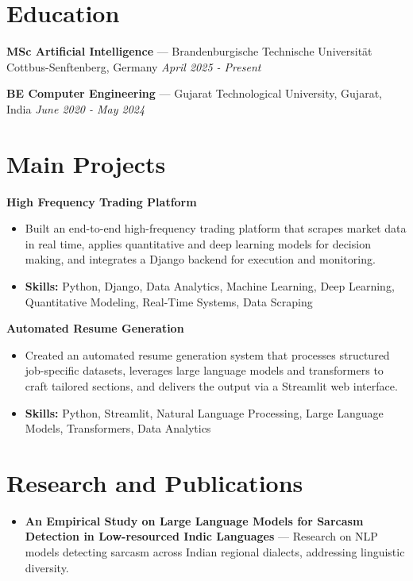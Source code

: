 \documentclass[a4paper,10pt]{article}
\begin{document}
\section*{Education}
\textbf{MSc Artificial Intelligence} — Brandenburgische Technische Universität Cottbus-Senftenberg, Germany \hfill \textit{April 2025 - Present}\par
\vspace{1.5pt}
\textbf{BE Computer Engineering} — Gujarat Technological University, Gujarat, India \hfill \textit{June 2020 - May 2024}\par

\section*{Main Projects}
\textbf{High Frequency Trading Platform}\par
\vspace{1pt}
\begin{itemize}
  \item Built an end-to-end high-frequency trading platform that scrapes market data in real time, applies quantitative and deep learning models for decision making, and integrates a Django backend for execution and monitoring.
  \item \textbf{Skills:} Python, Django, Data Analytics, Machine Learning, Deep Learning, Quantitative Modeling, Real-Time Systems, Data Scraping
\end{itemize}
\vspace{3pt}
\textbf{Automated Resume Generation}\par
\vspace{1pt}
\begin{itemize}
  \item Created an automated resume generation system that processes structured job-specific datasets, leverages large language models and transformers to craft tailored sections, and delivers the output via a Streamlit web interface.
  \item \textbf{Skills:} Python, Streamlit, Natural Language Processing, Large Language Models, Transformers, Data Analytics
\end{itemize}

\section*{Research and Publications}
\begin{itemize}
\item \textbf{An Empirical Study on Large Language Models for Sarcasm Detection in Low-resourced Indic Languages} — Research on NLP models detecting sarcasm across Indian regional dialects, addressing linguistic diversity.
\end{itemize}
\end{document}
